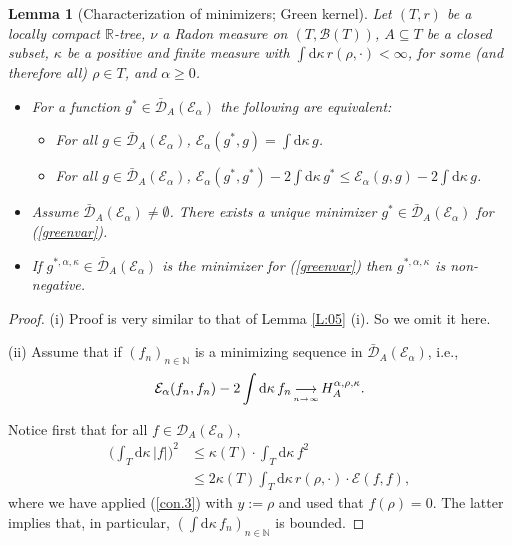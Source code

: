 \documentclass[11pt]{amsart}
\numberwithin{equation}{section}
\newtheorem{lemma}[definition]{Lemma}
\begin{document}
{\begin{lemma}[Characterization of minimizers; Green kernel] Let $(T,r)$ be a locally compact ${{\mathbb R}}$-tree, {$\nu$ a Radon measure on $(T,{\mathcal B}(T))$,}
$A\subseteq T$ be a  closed subset,
$\kappa$ be a positive and finite measure with $\int\mathrm{d}\kappa\,
r(\rho,\boldsymbol{\cdot})<\infty$, {for some (and therefore all) $\rho\in T$,} and $\alpha\ge 0$.
\begin{itemize}
\item[(i)]
For a function $g^\ast\in\bar{{\mathcal D}}_{A}({\mathcal E}_\alpha)$ the
following are equivalent: \label{L:03}
\begin{itemize}
\item[(a)] For all $g\in\bar{\mathcal D}_{A}({\mathcal E}_\alpha)$,
$\mathcal E_\alpha(g^\ast,g)=\int\mathrm{d}\kappa\,g$.
\item[(b)] For all $g\in\bar{{\mathcal D}}_{A}({\mathcal E}_\alpha)$,
${\mathcal E}_\alpha(g^\ast,g^\ast)-{2}\int\mathrm{d}\kappa\,g^\ast\le
{\mathcal E}_\alpha(g,g)-{2}\int\mathrm{d}\kappa\,g$.
\end{itemize}
\item[(ii)] Assume $\bar{{\mathcal D}}_{A}({\mathcal E}_\alpha) \not = \emptyset$. There exists a unique minimizer $g^\ast\in \bar{{\mathcal D}}_{A}({\mathcal E}_\alpha)$ for (\ref{greenvar}).
\item[(iii)] If  $g^{\ast,\alpha,\kappa}\in\bar{{\mathcal D}}_{A}({\mathcal E}_\alpha)$
is {the} minimizer for (\ref{greenvar}) then $g^{\ast,\alpha,\kappa}$ is non-negative.
\end{itemize}
\end{lemma}{\smallskip}

\begin{proof}
(i) Proof is very similar to that of Lemma \ref{L:05} (i). So we omit it here.{\smallskip}

(ii)  Assume that if $(f_n)_{n\in{{\mathbb N}}}$  is a minimizing sequence { in $\bar{\mathcal D}_A(\mathcal E_\alpha)$, i.e.,
\begin{equation}
\label{e:minim}
   {\mathcal E}_\alpha(f_n,f_n)-{2}\int\mathrm{d}\kappa\,f_n{{_{\displaystyle\longrightarrow\atop n\to\infty}}} H_A^{\alpha,{\rho},\kappa}.
\end{equation}}

Notice first that
for all $f\in{\mathcal D}_A(\mathcal E_{\alpha})$,
\begin{equation}\label{e:squareenerint}
\begin{aligned}
   \big(\int_{{T}}\mathrm d\kappa\,|f|\big)^2
 &\leq
   \kappa(T)\cdot\int_{{T}}\mathrm{d}\kappa\,f^2
  \\
 &\leq
   2\kappa(T)\int_{{T}}\mathrm{d}\kappa\,r(\rho,\boldsymbol{\cdot})\cdot \mathcal E(f,f),
\end{aligned}
\end{equation}
where we have applied (\ref{con.3}) with $y:={\rho}$ and used that $f(\rho)=0$.
The latter implies that, in particular, $(\int\mathrm{d}\kappa\, f_n)_{n\in{{\mathbb N}}}$ is bounded.


\end{proof}}
\end{document}
